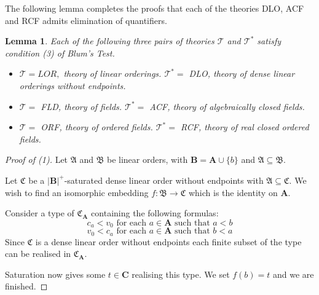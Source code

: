 \documentclass[titlepage, oneside]{amsbook}
\theoremstyle{plain}
\newtheorem{lemma}{Lemma}
\theoremstyle{definition}
\theoremstyle{remark}
\newcommand{\theory}{\ensuremath{\mathcal{T}}}
\newcommand{\tee}{\ensuremath{\mathcal{T}}}
\newcommand{\tst}{\ensuremath{\mathcal{T}^{\ast}}}
\newcommand{\seq}{\ensuremath{\subseteq}}
\newcommand{\ma}{\ensuremath{\mathfrak{A}}}
\newcommand{\mb}{\ensuremath{\mathfrak{B}}}
\newcommand{\mc}{\ensuremath{\mathfrak{C}}}
\newcommand{\ba}{\ensuremath{\mathbf{A}}}
\newcommand{\bb}{\ensuremath{\mathbf{B}}}
\newcommand{\bc}{\ensuremath{\mathbf{C}}}
\begin{document}
The following lemma completes the proofs that each of the theories DLO,
ACF and RCF admits elimination of quantifiers.



\begin{lemma} Each of the following three pairs of theories $\tee$ and
$\tst$ satisfy condition (3) of Blum's Test.
\begin{itemize}
\item[(1)] $\theory = LOR, $ theory of linear orderings.
$\theory^{\ast} =$ DLO, theory of dense linear orderings without
endpoints.
%
\item[(2)] $\theory =$ FLD, theory of fields. $\theory^{\ast} =$
ACF, theory of algebraically closed fields.
%
\item[(3)] $\theory =$ ORF, theory of ordered fields. $\theory^{\ast}
=$ RCF, theory of real closed ordered fields.

\end{itemize}

\end{lemma}

\begin{proof}[Proof of (1)] Let $\ma$ and $\mb$ be linear orders, with 
$\bb = \ba \cup \{ b \}$ and $\ma \seq \mb$. 

Let $\mc$ be a
$|\bb|^+$-saturated dense linear 
order without endpoints with $\ma \seq \mc$.
We wish to find an isomorphic embedding  $f: \mb \to \mc$ which is the
identity on $\ba$.

Consider a type of $\mc_ \ba $ containing the following formulas: \[ c_a 
< v_0 \mbox{ for each  } a \in \ba \mbox{ such that } a < b \]
\[ v_0 < c_a  \mbox{ for each } a \in \ba \mbox{ such that } b < a \]
Since $\mc$ is a dense linear order without endpoints each finite subset 
of the type can be realised in $\mc_ \ba$.

Saturation now gives some $t \in \bc$ realising this type.
We set $f(b) = t $ and we are finished.
\renewcommand{\qedsymbol}{}
\end{proof}
\end{document}
